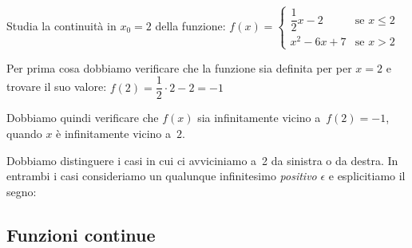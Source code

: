 \vspace{1em}

\begin{esempio} \label{limcont:ese_fparti}
Studia la continuità in \(x_0=2\) della funzione: 
\(f(x)=\begin{cases} 
    \dfrac{1}{2}x-2 & \text{se } x \leqslant 2 \\ 
    x^2-6x+7 & \text{se } x > 2
  \end{cases}\)

Per prima cosa dobbiamo verificare che la funzione sia definita per 
per \(x=2\) e trovare il suo valore: 
\(f(2) = \dfrac{1}{2} \cdot 2-2 = -1\)

Dobbiamo quindi verificare che \(f(x)\) sia infinitamente vicino 
a~\(f(2) = -1\), quando \(x\) è infinitamente vicino a~\(2\).

Dobbiamo distinguere i casi in cui ci avviciniamo a~2 da sinistra o da 
destra. In entrambi i casi consideriamo un qualunque infinitesimo 
\emph{positivo} \(\epsilon\) e esplicitiamo il segno:

\end{esempio}

\subsection{Funzioni continue}
\label{subsec:cont_definizione}

